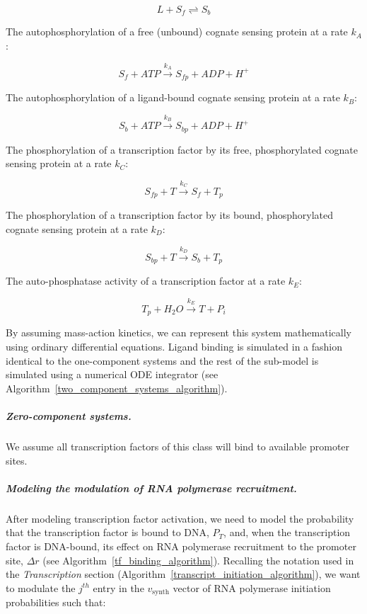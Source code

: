 \documentclass[12pt]{article}
\begin{document}
\begin{equation}
L + S_{f} \rightleftharpoons S_{b}
\end{equation}

\noindent The autophosphorylation of a free (unbound) cognate sensing protein at a rate \(k_A\):

\begin{equation}
S_{f} + ATP \overset{k_A}{\rightarrow} S_{fp} + ADP + H^+
\end{equation}

\noindent The autophosphorylation of a ligand-bound cognate sensing protein at a rate \(k_B\):

\begin{equation}
S_{b} + ATP \overset{k_B}{\rightarrow} S_{bp} + ADP + H^+
\end{equation}

\noindent The phosphorylation of a transcription factor by its free, phosphorylated cognate sensing protein at a rate \(k_C\):

\begin{equation}
S_{fp} + T \overset{k_C}{\rightarrow} S_{f} + T_{p}
\end{equation}

\noindent The phosphorylation of a transcription factor by its bound, phosphorylated cognate sensing protein at a rate \(k_D\):

\begin{equation}
S_{bp} + T \overset{k_D}{\rightarrow} S_{b} + T_{p}
\end{equation}

\noindent The auto-phosphatase activity of a transcription factor at a rate \(k_E\):

\begin{equation}
T_{p} + H_2O \overset{k_E}{\rightarrow} T + P_i
\end{equation}

\noindent By assuming mass-action kinetics, we can represent this system mathematically using ordinary differential equations.  Ligand binding is simulated in a fashion identical to the one-component systems and the rest of the sub-model is simulated using a numerical ODE integrator (see Algorithm~\ref{two_component_systems_algorithm}).

\subparagraph{Zero-component systems.}
We assume all transcription factors of this class will bind to available promoter sites.

\subparagraph{Modeling the modulation of RNA polymerase recruitment.}
After modeling transcription factor activation, we need to model the probability that the transcription factor is bound to DNA, \(P_T\), and, when the transcription factor is DNA-bound, its effect on RNA polymerase recruitment to the promoter site, \(\Delta r\) (see Algorithm~\ref{tf_binding_algorithm}).  Recalling the notation used in the \textit{Transcription} section (Algorithm~\ref{transcript_initiation_algorithm}), we want to modulate the \(j^{th}\) entry in the \(v_\text{synth}\) vector of RNA polymerase initiation probabilities such that:
\end{document}
